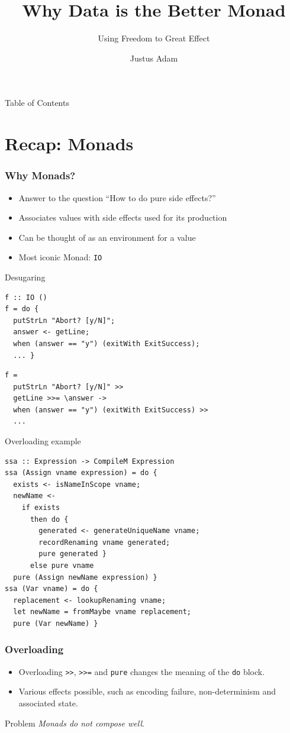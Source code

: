 \documentclass[aspectratio=169]{beamer}
\author{Justus Adam}
\title{Why Data is the Better Monad}
\subtitle{Using Freedom to Great Effect}
\begin{document}
\frame{\titlepage}

\begin{frame}{Table of Contents}
  \tableofcontents
\end{frame}

\section{Recap: Monads}

\begin{frame}
  \frametitle{Why Monads?}
  \begin{itemize}
  \item Answer to the question ``How to do pure side effects?''
  \item Associates values with side effects used for its production
  \item Can be thought of as an environment for a value
  \item Most iconic Monad: \texttt{IO}
  \end{itemize}
\end{frame}

\begin{frame}[fragile]{Desugaring}
  \begin{lstlisting}
f :: IO ()
f = do {
  putStrLn "Abort? [y/N]";
  answer <- getLine;
  when (answer == "y") (exitWith ExitSuccess);
  ... }
  \end{lstlisting}
  \pause
  \begin{lstlisting}
f =
  putStrLn "Abort? [y/N]" >>
  getLine >>= \answer ->
  when (answer == "y") (exitWith ExitSuccess) >>
  ...
  \end{lstlisting}
\end{frame}

\begin{frame}[fragile]{Overloading example}
  \begin{lstlisting}
ssa :: Expression -> CompileM Expression
ssa (Assign vname expression) = do {
  exists <- isNameInScope vname;
  newName <-
    if exists
      then do {
        generated <- generateUniqueName vname;
        recordRenaming vname generated;
        pure generated }
      else pure vname
  pure (Assign newName expression) }
ssa (Var vname) = do {
  replacement <- lookupRenaming vname;
  let newName = fromMaybe vname replacement;
  pure (Var newName) }
  \end{lstlisting}
\end{frame}

\begin{frame}
  \frametitle{Overloading}
  \begin{itemize}
  \item Overloading \texttt{>>}, \texttt{>>=} and \texttt{pure} changes the
    meaning of the \texttt{do} block.
  \item Various effects possible, such as encoding failure, non-determinism and
    associated state.
  \end{itemize}
  \pause
  \begin{block}{Problem}
  \emph{Monads do not compose well}.
  \end{block}
\end{frame}
\end{document}
